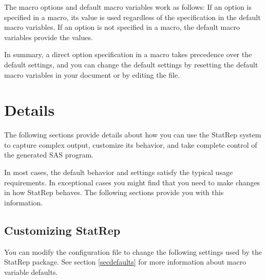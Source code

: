 \documentclass[article,oneside]{memoir}
\newcommand*{\StatRep}{\textsf{StatRep}\xspace}
\begin{document}
  The macro options and default macro variables work as follows:
  If an option is specified in a macro, its value is used regardless of  
  the specification in the default macro variables.
  If an option is not specified in a macro, the default macro variables provide 
  the values.
  
  In summary, a direct option specification in a macro takes precedence over the default
  settings, and you can change the default settings by resetting the 
  default macro variables
  in your document or by editing the  file.
  
     
\chapter{Details}

The following sections provide details about how you can use the \StatRep system
to capture complex output, customize its behavior, and take complete control
of the generated SAS program.

In most cases, the default behavior and settings satisfy the typical usage requirements.
In exceptional cases you might find that you need to make changes in how \StatRep behaves.
The following sections provide you with this information.


 \section{Customizing \StatRep}\label{custom}
 
  You can modify the configuration file  to change
the following settings used by the \StatRep package. 
  See section \ref{secdefaults} for more information about macro variable defaults. 
 
\end{document}
